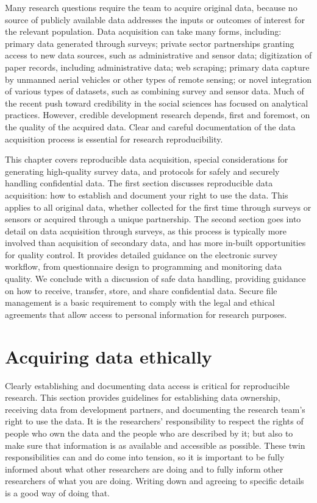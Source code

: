 
\begin{fullwidth}
Many research questions require the team to acquire original data,
because no source of publicly available data addresses the
inputs or outcomes of interest for the relevant population.
Data acquisition can take many forms, including:
primary data generated through surveys;
private sector partnerships granting access to new data sources, such as administrative and sensor data;
digitization of paper records, including administrative data; web scraping;
primary data capture by unmanned aerial vehicles or other types of remote sensing;
or novel integration of various types of datasets, such as combining survey and sensor data.
Much of the recent push toward credibility in the social sciences has focused on analytical practices.
However, credible development research depends, first and foremost, on the quality of the acquired data.
Clear and careful documentation of the data acquisition process is essential for research reproducibility.

This chapter covers reproducible data acquisition,
special considerations for generating high-quality survey data,
and protocols for safely and securely handling confidential data.
The first section discusses reproducible data acquisition:
how to establish and document your right to use the data.
This applies to all original data,
whether collected for the first time through surveys or sensors or acquired through a unique partnership.
The second section goes into detail on data acquisition through surveys,
as this process is typically more involved than acquisition of secondary data,
and has more in-built opportunities for quality control.
It provides detailed guidance on the electronic survey workflow,
from questionnaire design to programming and monitoring data quality.
We conclude with a discussion of safe data handling,
providing guidance on how to receive, transfer, store, and share confidential data.
Secure file management is a basic requirement to comply with the legal and
ethical agreements that allow  access to personal information for research purposes.


\end{fullwidth}

\section{Acquiring data ethically}

Clearly establishing and documenting data access is critical for reproducible research.
This section provides guidelines for 
establishing data ownership, receiving data from development partners,
and documenting the research team's right to use the data.
It is the researchers' responsibility to respect the rights
of people who own the data and the people who are described by it;
but also to make sure that information is as available and accessible as possible.
These twin responsibilities can and do come into tension,
so it is important to be fully informed about what other researchers are doing
and to fully inform other researchers of what you are doing.
Writing down and agreeing to specific details is a good way of doing that.


